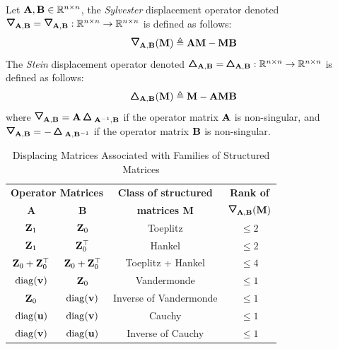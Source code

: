 \begin{definition}
  Let $\mathbf{A}, \mathbf{B} \in \mathbb{R}^{n \times n}$, the \emph{Sylvester} displacement operator denoted $\triangleopdown_{\Amat, \Bmat} = \triangleopdown_{\Amat, \Bmat}: \Rbb^{n \times n} \rightarrow \Rbb^{n \times n}$ is defined as follows:
  \begin{equation}
    \triangleopdown_{\Amat, \Bmat} (\Mmat) \triangleq \Amat \Mmat - \Mmat \Bmat
  \end{equation}
  The \emph{Stein} displacement operator denoted $\pmb{\bigtriangleup}_{\mathbf{A}, \mathbf{B}} = \pmb{\bigtriangleup}_{\mathbf{A}, \mathbf{B}}: \mathbb{R}^{n \times n} \rightarrow \mathbb{R}^{n \times n}$ is defined as follows:
  \begin{equation}
    \pmb{\bigtriangleup}_{\mathbf{A}, \mathbf{B}} (\mathbf{M}) \triangleq \mathbf{M} - \mathbf{A} \mathbf{M} \mathbf{B}
  \end{equation}
  where $\triangleopdown_{\Amat, \Bmat} = \Amat \triangleopup_{\Amat^{-1}, \Bmat}$ if the operator matrix $\mathbf{A}$ is non-singular, and $\triangleopdown_{\Amat, \Bmat} = -\triangleopup_{\Amat, \Bmat^{-1}}$ if the operator matrix $\mathbf{B}$ is non-singular.
\end{definition}

\begin{table}[ht]
  \centering
  \begin{tabular}{c|c|c|c}
    \toprule
    \multicolumn{2}{c|}{\textbf{Operator Matrices}} & \textbf{Class of structured} & \textbf{Rank of } \\
    \textbf{A} & \textbf{B} & \textbf{matrices M} & $\triangleopdown_{\Amat, \Bmat}(\Mmat)$ \\
    \midrule
    $\mathbf{Z}_1$                & $\mathbf{Z}_0$                & Toeplitz               & $\leq 2$ \\
    $\mathbf{Z}_1$                & $\mathbf{Z}_0^\top$           & Hankel                 & $\leq 2$ \\
    $\mathbf{Z}_0 + \mathbf{Z}_0^\top$ & $\mathbf{Z}_0 + \mathbf{Z}_0^\top$ & Toeplitz + Hankel      & $\leq 4$ \\
    $\mathrm{diag}(\mathbf{v})$           & $\mathbf{Z}_0$                & Vandermonde            & $\leq 1$ \\
    $\mathbf{Z}_0$                & $\mathrm{diag}(\mathbf{v})$           & Inverse of Vandermonde & $\leq 1$ \\
    $\mathrm{diag}(\mathbf{u})$           & $\mathrm{diag}(\mathbf{v})$           & Cauchy                 & $\leq 1$ \\
    $\mathrm{diag}(\mathbf{v})$           & $\mathrm{diag}(\mathbf{u})$           & Inverse of Cauchy      & $\leq 1$ \\
    \bottomrule
  \end{tabular}
  \caption{Displacing Matrices Associated with Families of Structured Matrices \cite{pan2001structured}}
  \label{table:ch2-displacing_matrices}
\end{table}

